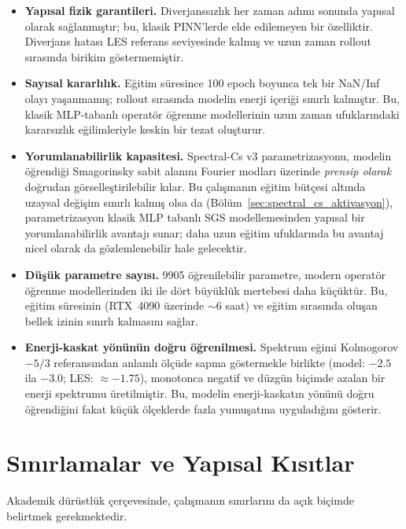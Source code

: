 \begin{itemize}
  \item \textbf{Yapısal fizik garantileri.} Diverjanssızlık her zaman adımı sonunda yapısal olarak sağlanmıştır; bu, klasik PINN'lerde elde edilemeyen bir özelliktir. Diverjans hatası LES referans seviyesinde kalmış ve uzun zaman rollout sırasında birikim göstermemiştir.

  \item \textbf{Sayısal kararlılık.} Eğitim süresince 100 epoch boyunca tek bir NaN/Inf olayı yaşanmamış; rollout sırasında modelin enerji içeriği sınırlı kalmıştır. Bu, klasik MLP-tabanlı operatör öğrenme modellerinin uzun zaman ufuklarındaki kararsızlık eğilimleriyle keskin bir tezat oluşturur.

  \item \textbf{Yorumlanabilirlik kapasitesi.} Spectral-Cs v3 parametrizasyonu, modelin öğrendiği Smagorinsky sabit alanını Fourier modları üzerinde \emph{prensip olarak} doğrudan görselleştirilebilir kılar. Bu çalışmanın eğitim bütçesi altında uzaysal değişim sınırlı kalmış olsa da (Bölüm~\ref{sec:spectral_cs_aktivasyon}), parametrizasyon klasik MLP tabanlı SGS modellemesinden yapısal bir yorumlanabilirlik avantajı sunar; daha uzun eğitim ufuklarında bu avantaj nicel olarak da gözlemlenebilir hale gelecektir.

  \item \textbf{Düşük parametre sayısı.} 9905 öğrenilebilir parametre, modern operatör öğrenme modellerinden iki ile dört büyüklük mertebesi daha küçüktür. Bu, eğitim süresinin (RTX~4090 üzerinde $\sim$6 saat) ve eğitim sırasında oluşan bellek izinin sınırlı kalmasını sağlar.

  \item \textbf{Enerji-kaskat yönünün doğru öğrenilmesi.} Spektrum eğimi Kolmogorov $-5/3$ referansından anlamlı ölçüde sapma göstermekle birlikte (model: $-2.5$ ila $-3.0$; LES: $\approx -1.75$), monotonca negatif ve düzgün biçimde azalan bir enerji spektrumu üretilmiştir. Bu, modelin enerji-kaskatın yönünü doğru öğrendiğini fakat küçük ölçeklerde fazla yumuşatma uyguladığını gösterir.
\end{itemize}

\section{Sınırlamalar ve Yapısal Kısıtlar}

Akademik dürüstlük çerçevesinde, çalışmanın sınırlarını da açık biçimde belirtmek gerekmektedir.

